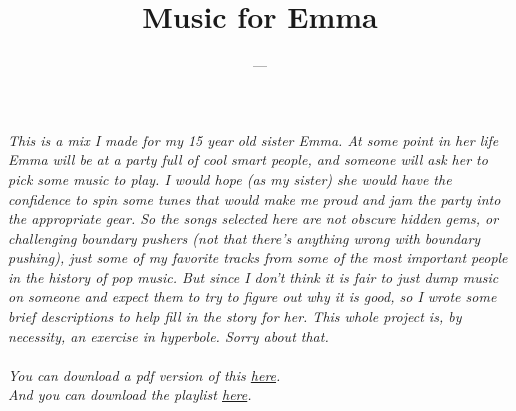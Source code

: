 \documentclass[letterpaper,single]{article}
\title{Music for Emma}
\date{}
\author{---}
\begin{document}
 
\maketitle
\itshape
This is a mix I made for my 15 year old sister Emma.
At some point in her life Emma will be at a party full of cool smart people, and someone will ask her to pick some music to play. I would hope (as my sister) she would have the confidence to spin some tunes that would make me proud and jam the party into the appropriate gear.
So the songs selected here are not obscure hidden gems, or challenging boundary pushers (not that there's anything wrong with boundary pushing), just some of my favorite tracks from some of the most important people in the history of pop music.
But since I don't think it is fair to just dump music on someone and expect them to try to figure out why it is good, so I wrote some brief descriptions to help fill in the story for her.
This whole project is, by necessity, an exercise in hyperbole. Sorry about that.\\ 
\\
You can download a pdf version of this \href{http://grannycart.net/musicforemma/texfiles/MusicforEmma.pdf}{here}.\\
And you can download the playlist \href{http://grannycart.net/musicforemma/musicforemma-tracks.zip}{here}.\\
\upshape
\end{document}
